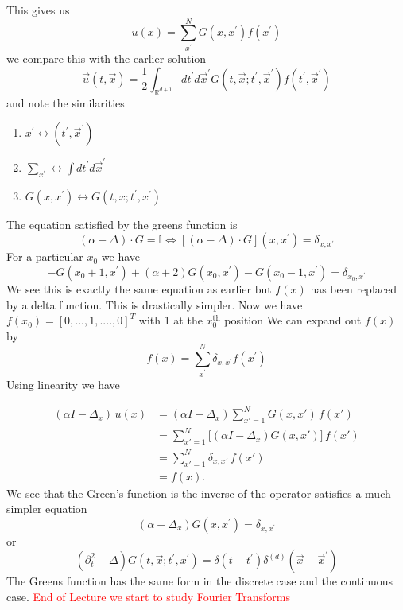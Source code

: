 \documentclass[11pt,a4paper]{article}
\begin{document}
This gives us
$$
u(x)=\sum_{x^{\prime}}^{N}G(x,x^{\prime})f(x^{\prime})$$
we compare this with the earlier solution
$$
\vec{u}(t,\vec{x})= \frac{1}{2}\int_{\mathbb{R}^{d+1}}dt^{\prime}d\vec{x}^{\prime}G(t,\vec{x};t^{\prime},\vec{x}^{\prime}) f(t^{\prime},\vec{x}^{\prime})
$$ 
and note the similarities
\begin{enumerate}
\item $x^{\prime}\leftrightarrow(t^{\prime},\vec{x}^{\prime})$	
\item $\sum_{x^{\prime}}\leftrightarrow \int dt^{\prime}d\vec{x}^{\prime}$
\item $G(x,x^{\prime})\leftrightarrow G(t,x;t^{\prime},x^{\prime})$
\end{enumerate}
The equation satisfied by the greens function is 
$$
(\alpha-\Delta)\cdot G = \mathbb{I} \Leftrightarrow [(\alpha-\Delta)\cdot G](x,x^{\prime}) = \delta_{x,x^{\prime}}
$$
For a particular $x_{0}$ we have
$$
-G(x_{0}+1,x^{\prime})+(\alpha+2)G(x_{0},x^{\prime})-G(x_{0}-1,x^{\prime})= \delta_{x_{0},x^{\prime}}
$$
We see this is exactly the same equation as earlier but $f(x)$ has been replaced by a delta function. This is drastically simpler. Now we have $f(x_{0}) = [0,...,1,....,0]^{T}$ with 1 at the $x_{0}^{\text{th}}$ position
We can expand out $f(x)$ by
$$
f(x) = \sum_{x^{\prime}}^{N}\delta_{x,x^{\prime}}f(x^{\prime})
$$
Using linearity we have

\begin{align*}
	(\alpha I - \Delta_x)\,u(x)
	&= (\alpha I - \Delta_x)\sum_{x'=1}^N G(x,x')\,f(x') \\
	&= \sum_{x'=1}^N \bigl[(\alpha I - \Delta_x)G(x,x')\bigr]\,f(x') \\
	&= \sum_{x'=1}^N \delta_{x,x'}\,f(x') \\
	&= f(x).
\end{align*}
We see that the Green's function is the inverse of the operator satisfies a much simpler equation 
$$
(\alpha - \Delta_{x})G(x,x^{\prime})=\delta_{x,x^{\prime}}
$$
or 
$$
(\partial_{t}^{2}-\Delta)G(t,\vec{x};t^{\prime},x^{\prime}) = \delta(t-t^{\prime})\delta^{(d)}(\vec{x}-\vec{x}^{\prime})
$$
The Greens function has the same form in the discrete case and the continuous case.
\textcolor{red}{End of Lecture we start to study Fourier Transforms}
\end{document}
